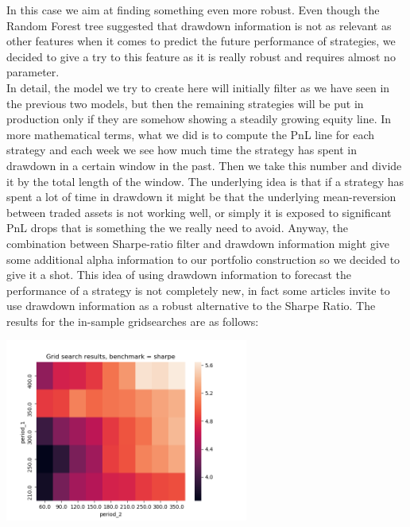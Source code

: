 In this case we aim at finding something even more robust. Even though the Random Forest tree suggested that drawdown information is not as relevant as other features when it comes to predict the future performance of strategies, we decided to give a try to this feature as it is really robust and requires almost no parameter.\\
In detail, the model we try to create here will initially filter as we have seen in the previous two models, but then the remaining strategies will be put in production only if they are somehow showing a steadily growing equity line. In more mathematical terms, what we did is to compute the PnL line for each strategy and each week we see how much time the strategy has spent in drawdown in a certain window in the past. Then we take this number and divide it by the total length of the window. The underlying idea is that if a strategy has spent a lot of time in drawdown it might be that the underlying mean-reversion between traded assets is not working well, or simply it is exposed to significant PnL drops that is something the we really need to avoid. Anyway, the combination between Sharpe-ratio filter and drawdown information might give some additional alpha information to our portfolio construction so we decided to give it a shot. This idea of using drawdown information to forecast the performance of a strategy is not completely new, in fact some articles \cite{challet} invite to use drawdown information as a robust alternative to the Sharpe Ratio. The results for the in-sample gridsearches are as follows: 

\begin{center}
	\centering
	\includegraphics[width=0.6\textwidth]{GridSearches/Average_Drawdown/Figure_1.png}
	\label{Average_Drawdown_1}
\end{center}

